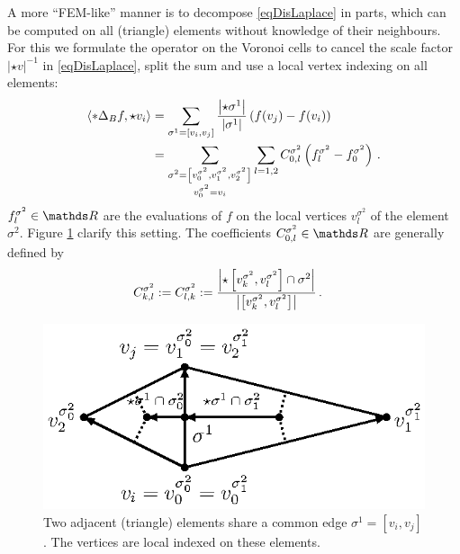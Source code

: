         A more ``FEM-like'' manner is to decompose \eqref{eqDisLaplace} in parts, which can be computed on all (triangle) elements without
        knowledge of their neighbours.
        For this we formulate the operator on the Voronoi cells to cancel the scale factor \( \left| \star v \right|^{-1} \) 
        in \eqref{eqDisLaplace}, split the sum and use a local vertex indexing on all elements:
        \begin{align} \label{eqVoronoiLaplace}
                \left\langle *\Delta_{B} f , \star v_{i} \right\rangle
                               &= \sum_{\sigma^{1}=\left[ v_{i}, v_{j} \right]} 
                     \frac{\left| \star\sigma^{1} \right|}{\left| \sigma^{1} \right|}
                      \left( f(v_{j}) - f(v_{i}) \right)\\
                               &= \sum_{\substack{\sigma^{2}=\left[ v^{\sigma^{2}}_{0},v^{\sigma^{2}}_{1},v^{\sigma^{2}}_{2} \right]
                              \\
                                               v^{\sigma^{2}}_{0} = v_{i}}}
                  \sum_{l=1,2} C^{\sigma^{2}}_{0,l} 
                          \left( f^{\sigma^{2}}_{l} -  f^{\sigma^{2}}_{0}\right) \,\text{.} \label{eqLokalLaplace}
        \end{align}
        \( f^{\sigma^{2}}_{l}\in\R \) are the evaluations of \( f \) on the local vertices \( v^{\sigma^{2}}_{l} \) of the element \(
        \sigma^{2}\).
        Figure \ref{figLocalIndexing} clarify this setting.
        The coefficients \( C^{\sigma^{2}}_{0,l}\in\R \) are generally defined by
        \begin{align} \label{eqLokalMatrixLaplace}
               C^{\sigma^{2}}_{k,l} &:= C^{\sigma^{2}}_{l,k}
                            := \frac{\left| \star \left[ v^{\sigma^{2}}_{k}, v^{\sigma^{2}}_{l} \right] 
                                            \cap \sigma^{2}\right|}
                                   {\left| \left[ v^{\sigma^{2}}_{k}, v^{\sigma^{2}}_{l} \right] \right|}\,\text{.}
        \end{align}
        \begin{figure}
          \centering
          \includegraphics[width=.45\textwidth]{bilder/tikz/elementSummeKante.eps}
          \caption{Two adjacent (triangle) elements share a common edge \( \sigma^{1}=\left[ v_{i}, v_{j} \right] \).
                   The vertices are local indexed on these elements.}
          \label{figLocalIndexing}
        \end{figure}
